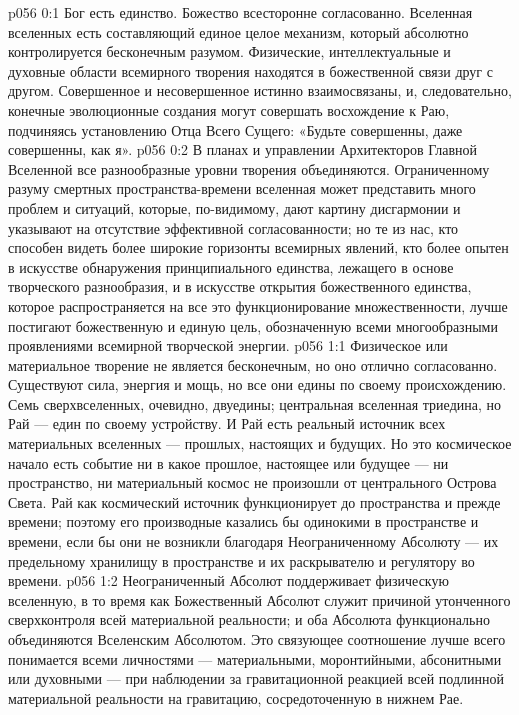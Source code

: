 \author{Могучий Вестник и Макивента Мелхиседек}
\vs p056 0:1 Бог есть единство. Божество всесторонне согласованно. Вселенная вселенных есть составляющий единое целое механизм, который абсолютно контролируется бесконечным разумом. Физические, интеллектуальные и духовные области всемирного творения находятся в божественной связи друг с другом. Совершенное и несовершенное истинно взаимосвязаны, и, следовательно, конечные эволюционные создания могут совершать восхождение к Раю, подчиняясь установлению Отца Всего Сущего: «Будьте совершенны, даже совершенны, как я».
\vs p056 0:2 В планах и управлении Архитекторов Главной Вселенной все разнообразные уровни творения объединяются. Ограниченному разуму смертных пространства\hyp{}времени вселенная может представить много проблем и ситуаций, которые, по\hyp{}видимому, дают картину дисгармонии и указывают на отсутствие эффективной согласованности; но те из нас, кто способен видеть более широкие горизонты всемирных явлений, кто более опытен в искусстве обнаружения принципиального единства, лежащего в основе творческого разнообразия, и в искусстве открытия божественного единства, которое распространяется на все это функционирование множественности, лучше постигают божественную и единую цель, обозначенную всеми многообразными проявлениями всемирной творческой энергии.
\vs p056 1:1 Физическое или материальное творение не является бесконечным, но оно отлично согласованно. Существуют сила, энергия и мощь, но все они едины по своему происхождению. Семь сверхвселенных, очевидно, двуедины; центральная вселенная триедина, но Рай --- един по своему устройству. И Рай есть реальный источник всех материальных вселенных --- прошлых, настоящих и будущих. Но это космическое начало есть событие  ни в какое  прошлое, настоящее или будущее --- ни пространство, ни материальный космос не произошли от центрального Острова Света. Рай как космический источник функционирует до пространства и прежде времени; поэтому его производные казались бы одинокими в пространстве и времени, если бы они не возникли благодаря Неограниченному Абсолюту --- их предельному хранилищу в пространстве и их раскрывателю и регулятору во времени.
\vs p056 1:2 \pc Неограниченный Абсолют поддерживает физическую вселенную, в то время как Божественный Абсолют служит причиной утонченного сверхконтроля всей материальной реальности; и оба Абсолюта функционально объединяются Вселенским Абсолютом. Это связующее соотношение лучше всего понимается всеми личностями --- материальными, моронтийными, абсонитными или духовными --- при наблюдении за гравитационной реакцией всей подлинной материальной реальности на гравитацию, сосредоточенную в нижнем Рае.
